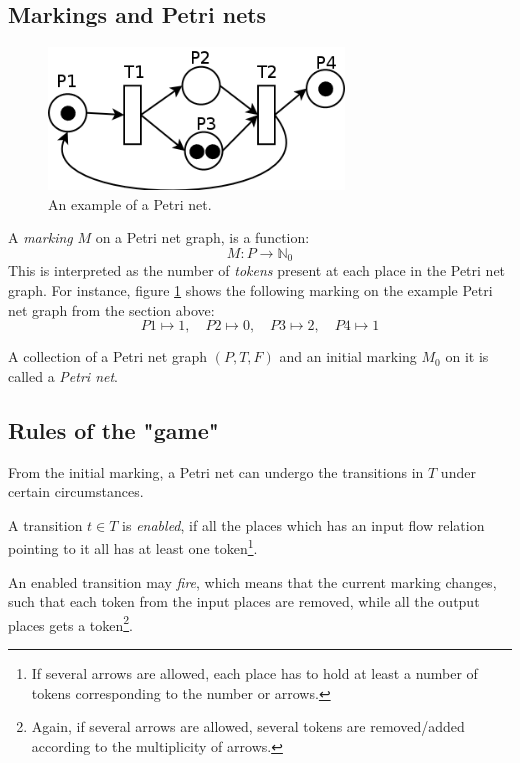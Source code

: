 \documentclass[12pt, a4paper]{article}
\numberwithin{equation}{section}
\begin{document}
\subsection{Markings and Petri nets}

\begin{figure}
\centering
\includegraphics[width=0.7\textwidth]{petri_marking}
\caption{An example of a Petri net.}
\label{fig:petri_marking}
\end{figure}

A \textit{marking} $M$ on a Petri net graph, is a function:
\begin{equation}
M: P\rightarrow\mathbb{N}_0
\end{equation}
This is interpreted as the number of \textit{tokens} present at each place in the Petri net graph. For instance, figure \ref{fig:petri_marking} shows the following marking on the example Petri net graph from the section above:
\begin{equation}
P1\mapsto 1,\quad P2\mapsto 0,\quad P3\mapsto 2,\quad P4\mapsto 1
\end{equation}

A collection of a Petri net graph $(P, T, F)$ and an initial marking $M_0$ on it is called a \textit{Petri net}.

\subsection{Rules of the "game"}
From the initial marking, a Petri net can undergo the transitions in $T$ under certain circumstances.

A transition $t\in T$ is \textit{enabled}, if all the places which has an input flow relation pointing to it all has at least one token\footnote{If several arrows are allowed, each place has to hold at least a number of tokens corresponding to the number or arrows.}.

An enabled transition may \textit{fire}, which means that the current marking changes, such that each token from the input places are removed, while all the output places gets a token\footnote{Again, if several arrows are allowed, several tokens are removed/added according to the multiplicity of arrows.}.
\end{document}
